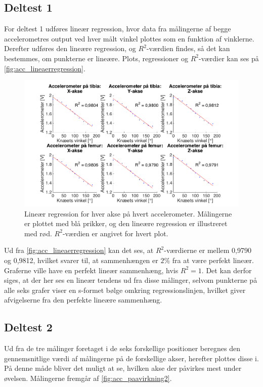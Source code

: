 \subsection{Deltest 1} \label{sec:resul_linear}
For deltest 1 udføres lineær regression, hvor data fra målingerne af begge accelerometres output ved hver målt vinkel plottes som en funktion af vinklerne. Derefter udføres den lineære regression, og $R^2$-værdien findes, så det kan bestemmes, om punkterne er lineære. Plots, regressioner og $R^2$-værdier kan ses på \autoref{fig:acc_lineaerregression}.

\begin{figure}[H]
\centering
\includegraphics[width=1.0\textwidth]{figures/lineaerregression}
\caption{Lineær regression for hver akse på hvert accelerometer. Målingerne er plottet med blå prikker, og den lineære regression er illustreret med rød. $R^2$-værdien er angivet for hvert plot.}
\label{fig:acc_lineaerregression}
\end{figure}

\noindent
Ud fra \autoref{fig:acc_lineaerregression} kan det ses, at $R^2$-værdierne er mellem 0,9790 og 0,9812, hvilket svarer til, at sammenhængen er $2\%$ fra at være perfekt lineær. Graferne ville have en perfekt lineær sammenhæng, hvis $R^2=1$. Det kan derfor siges, at der her ses en lineær tendens ud fra disse målinger, selvom punkterne på alle seks grafer viser en s-formet bølge omkring regressionslinjen, hvilket giver afvigelserne fra den perfekte lineære sammenhæng.

\subsection{Deltest 2}
Ud fra de tre målinger foretaget i de seks forskellige positioner beregnes den gennemsnitlige værdi af målingerne på de forskellige akser, herefter plottes disse i. På denne måde bliver det muligt at se, hvilken akse der påvirkes mest under øvelsen. Målingerne fremgår af \autoref{fig:acc_paavirkning2}. 

